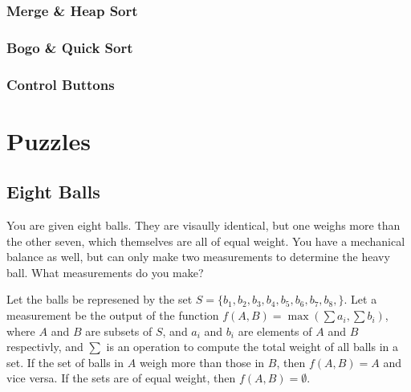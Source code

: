 \documentclass[12pt]{article}
\begin{document}
	\subsubsection{Merge \& Heap Sort}
	

	
	\pagebreak

	\subsubsection{Bogo \& Quick Sort}
	
	\pagebreak

	\subsubsection{Control Buttons}
	
	\pagebreak

	\normalsize
	\section{Puzzles}
	\subsection{Eight Balls}
	You are given eight balls. They are visaully identical, but one weighs more than the other seven, which themselves are all of equal weight. You have a mechanical balance as well, but can only make two measurements to determine the heavy ball. What measurements do you make? \linebreak

	Let the balls be represened by the set $S = \{b_1, b_2, b_3, b_4, b_5, b_6, b_7, b_8, \}$. Let a measurement be the output of the function $f(A, B) =  \max(\sum a_i, \sum b_i)$, where $A$ and $B$ are subsets of $S$, and $a_i$ and $b_i$ are elements of $A$ and $B$ respectivly, and $\sum$ is an operation to compute the total weight of all balls in a set. If the set of balls in $A$ weigh more than those in $B$, then $f(A, B) = A$ and vice versa. If the sets are of equal weight, then $f(A, B) = \emptyset$. \hfill \null \linebreak
\end{document}

